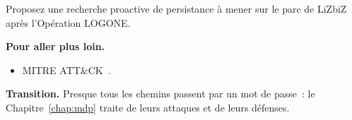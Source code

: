 \begin{boxexo}[title={\ding{45}\quad Exercice~12.10. Chasse \niveauexpert}]
Proposez une recherche proactive de persistance à mener sur le parc de
LiZbiZ après l'Opération LOGONE.
\end{boxexo}

\bigskip

\begin{boxinfo}
\textbf{Pour aller plus loin.}
\begin{itemize}
    \item MITRE ATT\&CK~\cite{mitreattack}.
\end{itemize}
\end{boxinfo}

\begin{boxinfo}
\textbf{Transition.} Presque tous les chemins passent par un mot de passe~:
le Chapitre~\ref{chap:mdp} traite de leurs attaques et de leurs défenses.
\end{boxinfo}
